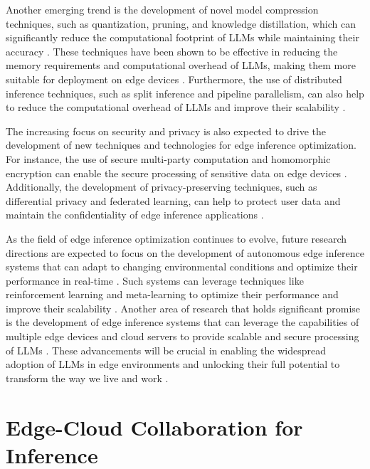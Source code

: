 \documentclass[11pt,a4paper]{article}
\begin{document}
Another emerging trend is the development of novel model compression techniques, such as quantization, pruning, and knowledge distillation, which can significantly reduce the computational footprint of LLMs while maintaining their accuracy \cite{doi:10.1109/icmla58977.2023.00104}. These techniques have been shown to be effective in reducing the memory requirements and computational overhead of LLMs, making them more suitable for deployment on edge devices \cite{doi:10.1145/3744244}. Furthermore, the use of distributed inference techniques, such as split inference and pipeline parallelism, can also help to reduce the computational overhead of LLMs and improve their scalability \cite{doi:10.37256/cnc.3220256807}.

The increasing focus on security and privacy is also expected to drive the development of new techniques and technologies for edge inference optimization. For instance, the use of secure multi-party computation and homomorphic encryption can enable the secure processing of sensitive data on edge devices \cite{doi:10.1109/compsac61105.2024.00206}. Additionally, the development of privacy-preserving techniques, such as differential privacy and federated learning, can help to protect user data and maintain the confidentiality of edge inference applications \cite{doi:10.1109/sp61157.2025.00182}.

As the field of edge inference optimization continues to evolve, future research directions are expected to focus on the development of autonomous edge inference systems that can adapt to changing environmental conditions and optimize their performance in real-time \cite{arxiv:2406.02616}. Such systems can leverage techniques like reinforcement learning and meta-learning to optimize their performance and improve their scalability \cite{arxiv:2405.14636}. Another area of research that holds significant promise is the development of edge inference systems that can leverage the capabilities of multiple edge devices and cloud servers to provide scalable and secure processing of LLMs \cite{arxiv:2405.14371}. These advancements will be crucial in enabling the widespread adoption of LLMs in edge environments and unlocking their full potential to transform the way we live and work \cite{arxiv:2409.00088}.


\section{Edge-Cloud Collaboration for Inference}
\end{document}
